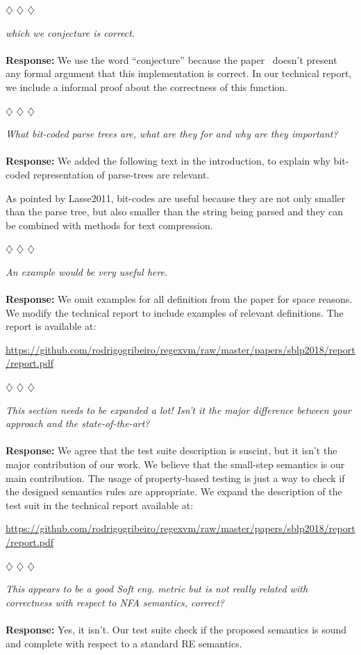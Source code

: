 \documentclass{article}
\newcommand{\separador}{\begin{center}
$\diamondsuit$ $\diamondsuit$ $\diamondsuit$
\end{center}}
\newcommand{\report}{\begin{center}\url{https://github.com/rodrigogribeiro/regexvm/raw/master/papers/sblp2018/report/report.pdf}\end{center}}
\begin{document}
\separador

\noindent\textit{which we conjecture is correct.}
\\
\\
\noindent\textbf{Response:} We use the word ``conjecture'' because the paper~\cite{Fischer2010} doesn't present any formal argument that this implementation is
correct. In our technical report, we include a informal proof about the correctness of this function.

\separador

\noindent\textit{What bit-coded parse trees are, what are they for and why are they important?}
\\
\\
\noindent\textbf{Response:} We added the following text in the introduction, to explain why bit-coded
representation of parse-trees are relevant.

As pointed by Lasse2011, bit-codes are useful because they
are not only smaller than the parse tree, but also smaller than the string being parsed and they can be combined with methods
for text compression.

\separador

\noindent\textit{An example would be very useful here.}
\\
\\
\noindent\textbf{Response:} We omit examples for all definition from the paper for space reasons. We modify the technical report to include
examples of relevant definitions. The report is available at:

\report

\separador

\noindent\textit{This section needs to be expanded a lot! Isn’t it the major difference between your approach and the state-of-the-art?}
\\
\\
\noindent\textbf{Response:}  We agree that the test suite description is suscint, but it isn't the major contribution of our work. We believe
that the small-step semantics is our main contribution. The usage of property-based testing is just a way to check if
the designed semantics rules are appropriate. We expand the description of the test suit in the technical report available at:

\report

\separador

\noindent\textit{This appears to be a good Soft eng. metric but is not really related with correctness with respect to NFA semantics, correct?}
\\
\\
\noindent\textbf{Response:} Yes, it isn't. Our test suite check if the proposed semantics is sound and complete with respect to a standard RE semantics.
\end{document}
